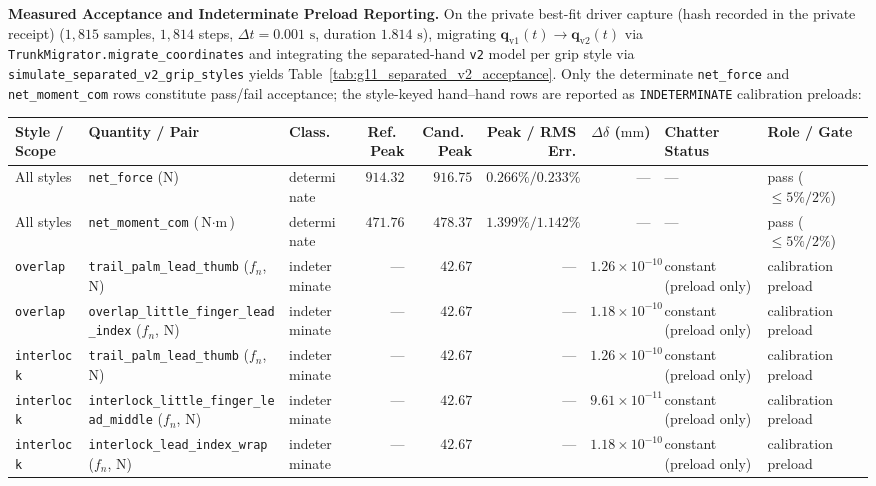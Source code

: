 \documentclass[11pt,a4paper]{article}
\begin{document}
\textbf{Measured Acceptance and Indeterminate Preload Reporting.} On the private best-fit driver capture (hash recorded in the private receipt) ($1{,}815$ samples, $1{,}814$ steps, $\Delta t = 0.001\text{ s}$, duration $1.814\text{ s}$), migrating $\mathbf{q}_{\mathrm{v1}}(t) \to \mathbf{q}_{\mathrm{v2}}(t)$ via \texttt{TrunkMigrator.migrate\_coordinates} and integrating the separated-hand \texttt{v2} model per grip style via \texttt{simulate\_separated\_v2\_grip\_styles} yields Table~\ref{tab:g11_separated_v2_acceptance}. Only the determinate \texttt{net\_force} and \texttt{net\_moment\_com} rows constitute pass/fail acceptance; the style-keyed hand--hand rows are reported as \texttt{INDETERMINATE} calibration preloads:

\begin{table}[htbp]
\centering
\scriptsize
\begin{tabular}{lllrrrrll}
\toprule
\textbf{Style / Scope} & \textbf{Quantity / Pair} & \textbf{Class.} & \textbf{Ref.\ Peak} & \textbf{Cand.\ Peak} & \textbf{Peak / RMS Err.} & \textbf{$\Delta\delta$ ($\text{mm}$)} & \textbf{Chatter Status} & \textbf{Role / Gate} \\
\midrule
All styles & \texttt{net\_force} ($\text{N}$) & determinate & $914.32$ & $916.75$ & $0.266\% / 0.233\%$ & --- & --- & pass ($\le 5\% / 2\%$) \\
All styles & \texttt{net\_moment\_com} ($\text{N}\cdot\text{m}$) & determinate & $471.76$ & $478.37$ & $1.399\% / 1.142\%$ & --- & --- & pass ($\le 5\% / 2\%$) \\
\midrule
\texttt{overlap} & \texttt{trail\_palm\_lead\_thumb} ($f_n$, $\text{N}$) & indeterminate & --- & $42.67$ & --- & $1.26 \times 10^{-10}$ & constant (preload only) & calibration preload \\
\texttt{overlap} & \texttt{overlap\_little\_finger\_lead\_index} ($f_n$, $\text{N}$) & indeterminate & --- & $42.67$ & --- & $1.18 \times 10^{-10}$ & constant (preload only) & calibration preload \\
\texttt{interlock} & \texttt{trail\_palm\_lead\_thumb} ($f_n$, $\text{N}$) & indeterminate & --- & $42.67$ & --- & $1.26 \times 10^{-10}$ & constant (preload only) & calibration preload \\
\texttt{interlock} & \texttt{interlock\_little\_finger\_lead\_middle} ($f_n$, $\text{N}$) & indeterminate & --- & $42.67$ & --- & $9.61 \times 10^{-11}$ & constant (preload only) & calibration preload \\
\texttt{interlock} & \texttt{interlock\_lead\_index\_wrap} ($f_n$, $\text{N}$) & indeterminate & --- & $42.67$ & --- & $1.18 \times 10^{-10}$ & constant (preload only) & calibration preload \\

\end{tabular}
\end{table}
\end{document}
